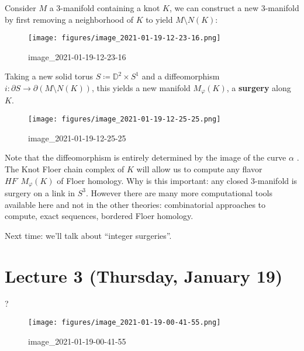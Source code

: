 \begin{definition}

Consider \(M\) a 3-manifold containing a knot \(K\), we can construct a
new 3-manifold by first removing a neighborhood of \(K\) to yield
\(M\setminus N(K)\):

\begin{figure}
\centering
\texttt{[image: figures/image\_2021-01-19-12-23-16.png]}
\caption{image\_2021-01-19-12-23-16}
\end{figure}

Taking a new solid torus \(S \coloneqq{\mathbb{D}}^2 \times S^1\) and a
diffeomorphism \(i: {{\partial}}S \to {{\partial}}(M \setminus N(K))\),
this yields a new manifold \(M _{\varphi} (K)\), a \textbf{surgery}
along \(K\).

\begin{figure}
\centering
\texttt{[image: figures/image\_2021-01-19-12-25-25.png]}
\caption{image\_2021-01-19-12-25-25}
\end{figure}

\end{definition}

\begin{remark}

Note that the diffeomorphism is entirely determined by the image of the
curve \(\alpha\) . The Knot Floer chain complex of \(K\) will allow us
to compute any flavor \(HF^{\,\cdot\,}M _{\varphi} (K)\) of Floer
homology. Why is this important: any closed 3-manifold is surgery on a
link in \(S^3\). However there are many more computational tools
available here and not in the other theories: combinatorial approaches
to compute, exact sequences, bordered Floer homology.

\end{remark}

Next time: we'll talk about ``integer surgeries''.

\hypertarget{lecture-3-thursday-january-19}{%
\section{Lecture 3 (Thursday, January
19)}\label{lecture-3-thursday-january-19}}

\begin{definition}[$p/q$ Surgery]

?

\end{definition}

\begin{figure}
\centering
\texttt{[image: figures/image\_2021-01-19-00-41-55.png]}
\caption{image\_2021-01-19-00-41-55}
\end{figure}

